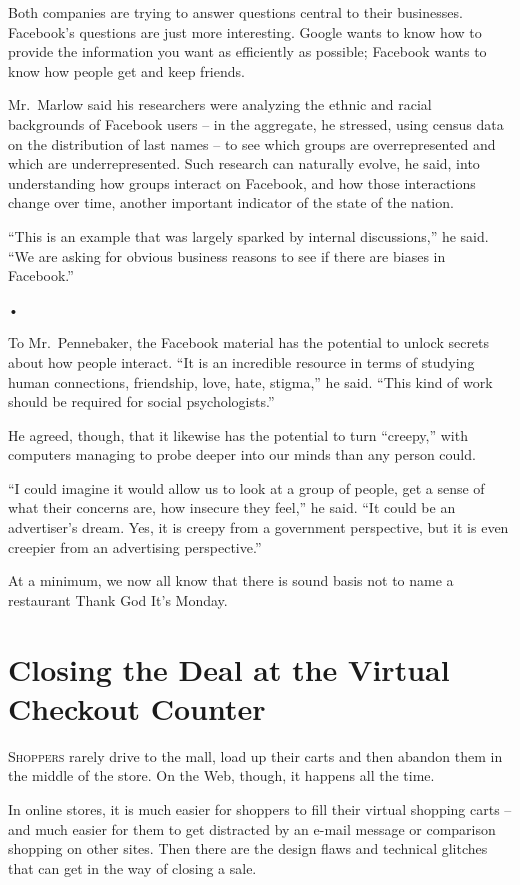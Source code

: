 ﻿\documentclass[12pt]{article}
\begin{document}
Both companies are trying to answer questions central to their businesses. Facebook's questions are
just more interesting. Google wants to know how to provide the information you want as efficiently
as possible; Facebook wants to know how people get and keep friends.

Mr.~Marlow said his researchers were analyzing the ethnic and racial backgrounds of Facebook users
-- in the aggregate, he stressed, using census data on the distribution of last names -- to see
which groups are overrepresented and which are underrepresented. Such research can naturally evolve,
he said, into understanding how groups interact on Facebook, and how those interactions change over
time, another important indicator of the state of the nation.

``This is an example that was largely sparked by internal discussions,'' he said. ``We are asking
for obvious business reasons to see if there are biases in Facebook.''

•

To Mr.~Pennebaker, the Facebook material has the potential to unlock secrets about how people
interact. ``It is an incredible resource in terms of studying human connections, friendship, love,
hate, stigma,'' he said. ``This kind of work should be required for social psychologists.''

He agreed, though, that it likewise has the potential to turn ``creepy,'' with computers managing to
probe deeper into our minds than any person could.

``I could imagine it would allow us to look at a group of people, get a sense of what their concerns
are, how insecure they feel,'' he said. ``It could be an advertiser's dream. Yes, it is creepy from
a government perspective, but it is even creepier from an advertising perspective.''

At a minimum, we now all know that there is sound basis not to name a restaurant Thank God It's
Monday.

\section{Closing the Deal at the Virtual Checkout Counter}

\lettrine{S}{hoppers} rarely drive to the mall, load up their carts and then
abandon them in the middle of the store. On the Web, though, it happens all the time.

In online stores, it is much easier for shoppers to fill their virtual shopping carts -- and much
easier for them to get distracted by an e-mail message or comparison shopping on other sites. Then
there are the design flaws and technical glitches\cite{glitch} that can get in the way of closing a
sale.
\end{document}
